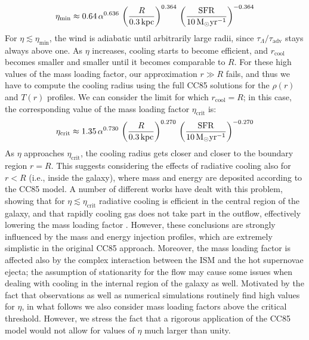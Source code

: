 \begin{align}
    \eta_\mathrm{min} \approx 0.64\,\alpha^{0.636}\,\left(\frac{R}{0.3\,\mathrm{kpc}}\right)^{0.364}\,\left(\frac{\mathrm{SFR}}{10\,{\rm M}_{\odot}\mathrm{yr}^{-1}}\right)^{-0.364}
\end{align}
For $\eta \lesssim \eta_\mathrm{min}$, the wind is adiabatic until arbitrarily large radii, since $\tau_\Lambda/\tau_\mathrm{adv}$ stays always above one. As $\eta$ increases, cooling starts to become efficient, and $r_\mathrm{cool}$ becomes smaller and smaller until it becomes comparable to $R$. For these high values of the mass loading factor, our approximation $r\gg R$ fails, and thus we have to compute the cooling radius using the full CC85 solutions for the $\rho(r)$ and $T(r)$ profiles. We can consider the limit for which $r_\mathrm{cool} = R$; in this case, the corresponding value of the mass loading factor $\eta_\mathrm{crit}$ is:
\begin{align}
    \eta_\mathrm{crit} \approx 1.35\,\alpha^{0.730}\,\left(\frac{R}{0.3\,\mathrm{kpc}}\right)^{0.270}\,\left(\frac{\mathrm{SFR}}{10\,{\rm M}_{\odot}\mathrm{yr}^{-1}}\right)^{-0.270} \label{eq:eta_crit}
\end{align}
As $\eta$ approaches $\eta_\mathrm{crit}$, the cooling radius gets closer and closer to the boundary region $r=R$. This suggests considering the effects of radiative cooling also for $r<R$ (i.e., inside the galaxy), where mass and energy are deposited according to the CC85 model. A number of different works have dealt with this problem, showing that for $\eta \lesssim \eta_\mathrm{crit}$ radiative cooling is efficient in the central region of the galaxy, and that rapidly cooling gas does not take part in the outflow, effectively lowering the mass loading factor \citep[for details, see][]{tenorio2007hydrodynamics, lochhaas2021characteristic}. However, these conclusions are strongly influenced by the mass and energy injection profiles, which are extremely simplistic in the original CC85 approach. Moreover, the mass loading factor is affected also by the complex interaction between the ISM and the hot supernovae ejecta; the assumption of stationarity for the flow may cause some issues when dealing with cooling in the internal region of the galaxy as well. Motivated by the fact that observations \citep{Heckman15, gallerani:2018, zhang2021empirical} as well as numerical simulations \citep{muratov2015,mitchell2020galactic, pandya2021characterizing} routinely find high values for $\eta$, in what follows we also consider mass loading factors above the critical threshold. However, we stress the fact that a rigorous application of the CC85 model would not allow for values of $\eta$ much larger than unity.

